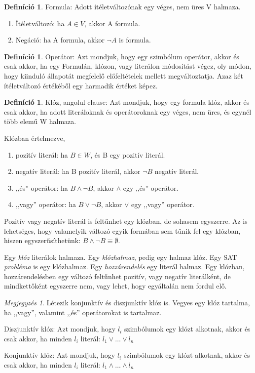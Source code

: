 \documentclass[
]{thesis-ekf}
\theoremstyle{definition}
\newtheorem{definicio}[tetel]{Definíció}
\theoremstyle{remark}
\newtheorem{megjegyzes}[tetel]{Megjegyzés}
\begin{document}
	\begin{definicio}
		Formula: Adott ítéletváltozónak egy véges, nem üres V halmaza.
		\begin{enumerate}
			\item Ítéletváltozó: ha $ A\in V $, akkor A formula.
			\item Negáció: ha A formula, akkor $\neg A $ is formula.
		\end{enumerate}
	\end{definicio}

	\begin{definicio}
		Operátor: Azt mondjuk, hogy egy szimbólum operátor, akkor és csak akkor, ha egy Formulán, klózon, vagy literálon módosítást végez, oly módon, hogy kiinduló állapotát megfelelő előfeltételek mellett megváltoztatja. Azaz két ítéletváltozó értékéből egy harmadik értéket képez.
	\end{definicio}
	
	\begin{definicio}
		Klóz, angolul clause: Azt mondjuk, hogy egy formula klóz, akkor és csak akkor, ha adott literáloknak és operátoroknak egy véges, nem üres, és egynél több elemű W halmaza.

		Klózban értelmezve,
		\begin{enumerate}
			\item pozitív literál: ha $ B\in W $, és B egy pozitív literál.
			\item negatív literál: ha B pozitív literál, akkor $\neg B $ negatív literál.
			\item ,,és'' operátor: ha $ B \wedge \neg B $, akkor $\wedge$ egy ,,és'' operátor.
			\item ,,vagy'' operátor: ha $ B \vee \neg B $, akkor $\vee$ egy ,,vagy'' operátor.
		\end{enumerate}
		Pozitív vagy negatív literál is feltűnhet egy klózban, de sohasem egyszerre. Az is lehetséges, hogy valamelyik változó egyik formában sem tűnik fel egy klózban, hiszen egyszerűsíthetünk: $ B \wedge\neg B \equiv\emptyset $.
		
		Egy \emph{klóz} literálok halmaza. Egy \emph{klózhalmaz}, pedig egy halmaz klóz. Egy \textsc{SAT} \emph{probléma} is egy klózhalmaz. Egy \emph{hozzárendelés} egy literál halmaz. Egy klózban, hozzárendelésben egy változó feltűnhet pozitív, vagy negatív literálként, de mindkettőként egyszerre nem, vagy lehet, hogy egyáltalán nem fordul elő\cite{am}.
	\end{definicio}
	
	\begin{megjegyzes}
		Létezik konjunktív és diszjunktív klóz is. Vegyes egy klóz tartalma, ha ,,vagy'', valamint ,,és'' operátorokat is tartalmaz.
	
		Diszjunktív klóz: Azt mondjuk, hogy $ l_{i} $ szimbólumok egy klózt alkotnak, akkor és csak akkor, ha minden $ l_{i} $ literál: $ l_{1}\vee\dots\vee l_{n} $
		
		Konjunktív klóz: Azt mondjuk, hogy $ l_{i} $ szimbólumok egy klózt alkotnak, akkor és csak akkor, ha minden $ l_{i} $ literál: $ l_{1}\wedge\dots\wedge l_{n} $
	\end{megjegyzes}
\end{document}
